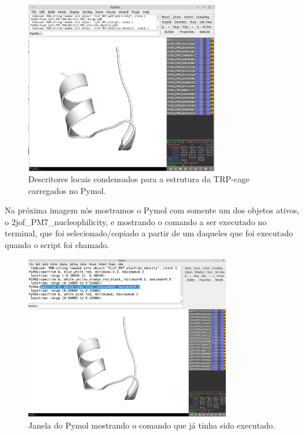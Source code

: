 \documentclass[a4paper,11pt]{refart}
\begin{document}
\hspace*{-\leftmarginwidth}
\begin{minipage}{\fullwidth}
\begin{figure}[H]
\begin{center}
\includegraphics[width=3.3in]{images/tut3_img7}
\caption{Descritores locais condensados para a estrutura da TRP-cage carregados no Pymol.}
\label{fig_tut3_5}
\end{center}
\end{figure}
\end{minipage}

Na próxima imagem nós mostramos o Pymol com somente um dos objetos ativos, o 2jof\_PM7\_nucleophilicity, e mostrando o comando a ser executado no terminal, que foi selecionado/copiado a partir de um daqueles que foi executado quando o script foi chamado.


\hspace*{-\leftmarginwidth}
\begin{minipage}{\fullwidth}
	\begin{figure}[H]
		\begin{center}
			\includegraphics[width=3.5in]{images/tut3_img8}
			\caption{Janela do Pymol mostrando o comando que já tinha sido executado.}
			\label{fig_tut3_6}
		\end{center}
	\end{figure}
\end{minipage}
\end{document}
